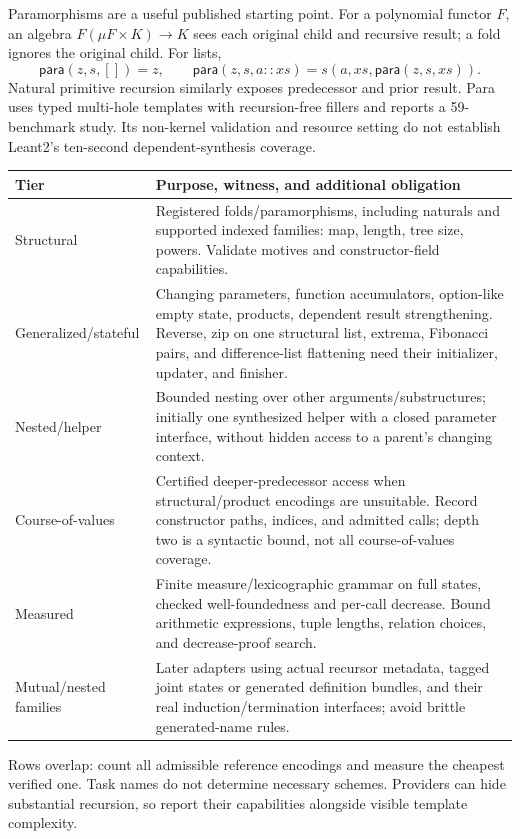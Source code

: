 Paramorphisms are a useful published starting point. For a polynomial functor
$F$, an algebra $F(\mu F\times K)\to K$ sees each original child and recursive
result; a fold ignores the original child. For lists,
\[
 \mathsf{para}(z,s,[])=z,\qquad
 \mathsf{para}(z,s,a::xs)=s(a,xs,\mathsf{para}(z,s,xs)).
\]
Natural primitive recursion similarly exposes predecessor and prior result.
Para uses typed multi-hole templates with recursion-free fillers and reports
a 59-benchmark study. Its non-kernel validation and resource setting do not
establish Leant2's ten-second dependent-synthesis coverage.\cite{para}

\begin{longtable}{@{}L{.23\linewidth}L{.69\linewidth}@{}}
\toprule
Tier & Purpose, witness, and additional obligation\\
\midrule\endhead
Structural &
Registered folds/paramorphisms, including naturals and supported indexed
families: map, length, tree size, powers. Validate motives and
constructor-field capabilities.\\
Generalized/stateful &
Changing parameters, function accumulators, option-like empty state, products,
dependent result strengthening. Reverse, zip on one structural list, extrema,
Fibonacci pairs, and difference-list flattening need their initializer,
updater, and finisher.\\
Nested/helper &
Bounded nesting over other arguments/substructures; initially one synthesized
helper with a closed parameter interface, without hidden access to a parent's
changing context.\\
Course-of-values &
Certified deeper-predecessor access when structural/product encodings are
unsuitable. Record constructor paths, indices, and admitted calls; depth two
is a syntactic bound, not all course-of-values coverage.\\
Measured &
Finite measure/lexicographic grammar on full states, checked well-foundedness
and per-call decrease. Bound arithmetic expressions, tuple lengths, relation
choices, and decrease-proof search.\\
Mutual/nested families &
Later adapters using actual recursor metadata, tagged joint states or generated
definition bundles, and their real induction/termination interfaces; avoid
brittle generated-name rules.\\
\bottomrule
\end{longtable}
Rows overlap: count all admissible reference encodings and measure the cheapest
verified one. Task names do not determine necessary schemes. Providers can
hide substantial recursion, so report their capabilities alongside visible
template complexity.


